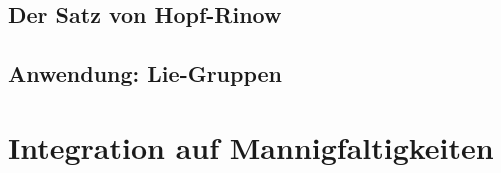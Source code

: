 \documentclass[a4paper]{scrreprt}
\numberwithin{equation}{chapter}
\theoremstyle{definition}
\begin{document}
	\section{Der Satz von Hopf-Rinow}
	\section{Anwendung: Lie-Gruppen}


\chapter{Integration auf Mannigfaltigkeiten}


\appendix
{} %
\end{document}
